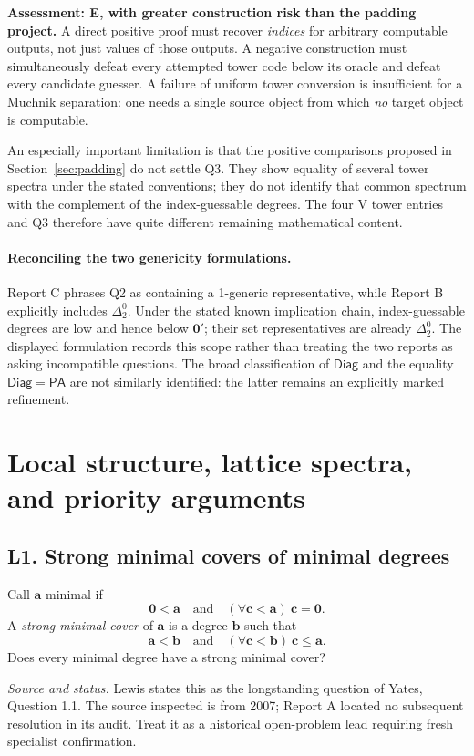 \documentclass[11pt,a4paper]{article}
\newcommand{\zero}{\mathbf0}
\newcommand{\adeg}{\mathbf a}\newcommand{\bdeg}{\mathbf b}
\newcommand{\cdeg}{\mathbf c}\newcommand{\ddeg}{\mathbf d}
\newcommand{\PA}{\mathsf{PA}}\newcommand{\DNR}{\mathsf{DNR}}
\newcommand{\Diag}{\mathsf{Diag}}\newcommand{\IG}{\mathsf{IG}}
\newcommand{\status}[1]{\par\noindent\textit{Source and status.} #1\par}
\theoremstyle{definition}\newtheorem{definition}[theorem]{Definition}
\theoremstyle{remark}\newtheorem{remark}[theorem]{Remark}
\begin{document}
\textbf{Assessment: E, with greater construction risk than the padding project.}
A direct positive proof must recover \emph{indices} for arbitrary computable
outputs, not just values of those outputs. A negative construction must
simultaneously defeat every attempted tower code below its oracle and defeat
every candidate guesser. A failure of uniform tower conversion is insufficient
for a Muchnik separation: one needs a single source object from which
\emph{no} target object is computable.

An especially important limitation is that the positive comparisons proposed in Section~\ref{sec:padding} do not settle Q3. They show equality of several tower spectra under
the stated conventions; they do not identify that common spectrum with the
complement of the index-guessable degrees. The four V tower entries and Q3 therefore
have quite different remaining mathematical content.

\paragraph{Reconciling the two genericity formulations.}
Report C phrases Q2 as containing a 1-generic representative, while Report B explicitly includes $\Delta^0_2$. Under the stated known implication chain, index-guessable degrees are low and hence below $\zero'$; their set representatives are already $\Delta^0_2$. The displayed formulation records this scope rather than treating the two reports as asking incompatible questions. The broad classification of $\Diag$ and the equality $\Diag=\PA$ are not similarly identified: the latter remains an explicitly marked refinement.\cite{LMNS,Workshop25}


\section{Local structure, lattice spectra, and priority arguments}
\label{sec:local}

\subsection{L1. Strong minimal covers of minimal degrees \Lmark}
\label{entry:L1}

Call $\adeg$ minimal if
\[
 \zero<\adeg\quad\text{and}\quad
 (\forall\cdeg<\adeg)\ \cdeg=\zero.
\]
A \emph{strong minimal cover} of $\adeg$ is a degree $\bdeg$ such that
\[
 \adeg<\bdeg\quad\text{and}\quad
 (\forall\cdeg<\bdeg)\ \cdeg\leq\adeg.
\]
Does every minimal degree have a strong minimal cover?
\status{Lewis states this as the longstanding question of Yates, Question 1.1. The source inspected is from 2007; Report A located no subsequent resolution in its audit. Treat it as a historical open-problem lead requiring fresh specialist confirmation.\cite{Lewis}}
\end{document}
